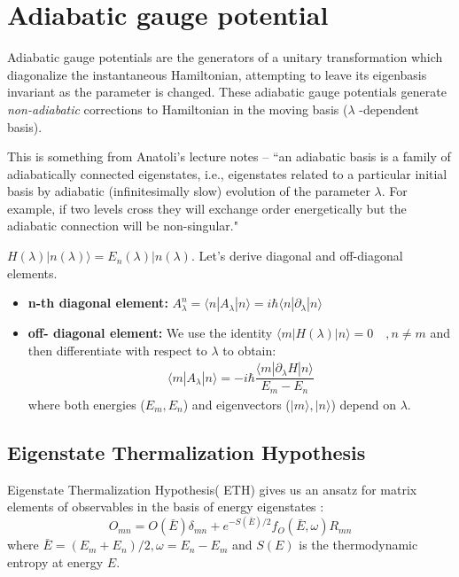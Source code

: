 \documentclass[11pt,a4paper]{article}
\begin{document}
\section{Adiabatic gauge potential}
Adiabatic gauge potentials are the generators of a unitary transformation which diagonalize the instantaneous Hamiltonian, attempting to leave its eigenbasis invariant as the parameter is changed. These adiabatic gauge potentials generate \textit{non-adiabatic} corrections to Hamiltonian in the moving basis ($\lambda$ -dependent basis).
 
 This is something from Anatoli's lecture notes \cite{kolodrubetz2016geometry}--
``an adiabatic basis is a family of adiabatically connected eigenstates, i.e., eigenstates related
to a particular initial basis by adiabatic (infinitesimally slow) evolution of the parameter $\lambda$. For example, if two levels cross they will exchange order energetically but the adiabatic connection will be non-singular."


$H (\lambda) |n(\lambda) \rangle = E_n (\lambda) |n(\lambda) $. Let's derive diagonal and off-diagonal elements. 


\begin{itemize}
\item \textbf{n-th diagonal element:} $A_{\lambda}^n= \langle n |A_{\lambda} | n \rangle=  i \hbar\langle n |\partial_{\lambda} | n \rangle $
\item \textbf{off- diagonal element:} We use the identity $\langle m |H(\lambda) | n \rangle=0 \quad, n \neq m$ and then differentiate with respect to $\lambda$ to obtain:
\begin{align}
\boxed{\langle m |A_{\lambda} | n \rangle =  -i \hbar \dfrac{\langle m |\partial_{\lambda}H | n \rangle}{E_m-E_n}}
\end{align}
where both  energies ($E_m, E_n$) and eigenvectors ($|m \rangle, |n \rangle$) depend on $\lambda$.
\end{itemize}







\subsection{Eigenstate Thermalization Hypothesis}
Eigenstate Thermalization Hypothesis( ETH) gives us an ansatz for matrix elements of observables in the basis of energy eigenstates  \cite{d2016quantum}:
\begin{equation}
O_{mn}= O( \bar{E}) \delta_{mn} + e^{-S(\bar{E})/2} f_O(\bar{E}, \omega) R_{mn}
\end{equation}
where $\bar{E}= (E_m +E_n)/2, \omega= E_n- E_m$ and $S(E)$ is the thermodynamic entropy at energy $E$.
\end{document}
